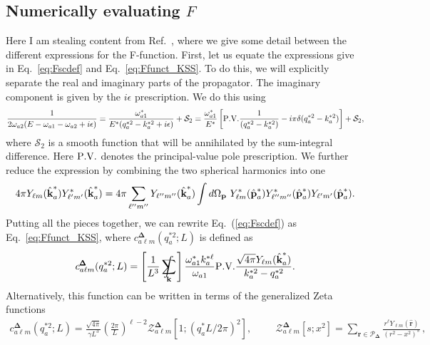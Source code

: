    \subsection{Numerically evaluating $F$}
 
 \label{app:Fnum}
 
 Here I am stealing content from Ref.~\cite{Briceno:2015tza}, where we give some detail between the different expressions for the F-function. First, let us equate the expressions give in Eq.~\ref{eq:Fscdef} and Eq.~\ref{eq:Ffunct_KSS}. To do this, we will explicitly separate the real and imaginary parts of the propagator. The imaginary component is given by the $i \epsilon$ prescription.  We do this using 
\begin{align}
\label{eq:PVdef}
\frac{1}{2 \omega_{a2}(E -  \omega_{a1} - \omega_{a2} + i \epsilon )}
= \frac{\omega_{a1}^*}{E^* (q_a^{*2}-k_a^{*2}+i\epsilon)} + \mathcal S_2
=\frac{\omega_{a1}^*}{E^*}\left[{\rm{P.V.}}\frac{1}{(q_a^{*2}-k_a^{*2})}-i\pi\delta(q_a^{*2}-k_a^{*2})\right] + \mathcal S_2,
\end{align}
where $\mathcal S_2$ is a smooth function that will be annihilated by the sum-integral difference. Here ${\rm{P.V.}}$ denotes the principal-value pole prescription. We further reduce the expression by combining the two spherical harmonics into one
\begin{equation}
4 \pi  Y_{\ell m}(\hat {\textbf k}^*_a)Y^*_{\ell' m'}(\hat {\textbf k}^*_a) =
{4 \pi}\sum_{\ell''m''}
  Y_{\ell'' m''}(\hat {\textbf k}^*_a)
\int d\Omega_{\textbf p}~Y^*_{ \ell m}(\hat {\textbf p}^*_a) Y^*_{\ell'' m''}(\hat {\textbf p}^*_a) Y_{\ell' m'}(\hat {\textbf p}^*_a).
\end{equation}
Putting all the pieces together, we can rewrite Eq.~(\ref{eq:Fscdef}) as Eq.~\ref{eq:Ffunct_KSS}, where $c_{a \ell m}^{{\pmb \Delta}}(q_a^{*2};{L})$ is defined as
\begin{equation}
c_{a \ell m}^{{\pmb \Delta}}(q^{*2}_a;{L})
=
\left[\frac{1}{L^3}\sum_{\mathbf{k}}\hspace{-.5cm}\int~\right]
\frac{\omega_{a1}^*k_a^{*\ell}}{\omega_{a1}}
{\rm{P.V.}}\frac{ \sqrt{4 \pi}  Y_{\ell m}(\hat {\textbf k}^*_a)  }{  k_a^{*2}-q_a^{*2}}.
\end{equation}
Alternatively, this function can be written in terms of the generalized Zeta functions~\cite{Kim:2005gf}
\begin{eqnarray}
\label{eq:clm}
c^{\pmb \Delta}_{a\ell m}(q_a^{*2}; {L})
=\frac{\sqrt{4\pi}}{\gamma L^3}\left(\frac{2\pi}{L}\right)^{\ell-2}\mathcal{Z}^{\pmb \Delta}_{a\ell m}[1;(q_a^* {L}/2\pi)^2],
\hspace{1cm}
\mathcal{Z}^{\pmb \Delta}_{a \ell m}[s;x^2]
= \sum_{\mathbf r \in {\mathcal P}_{{\pmb \Delta}}}\frac{{r}^\ell Y_{\ell m}(\hat {\mathbf{r}})}{(r^2-x^2)^s} \label{eq:clm} \,,
\end{eqnarray} 
